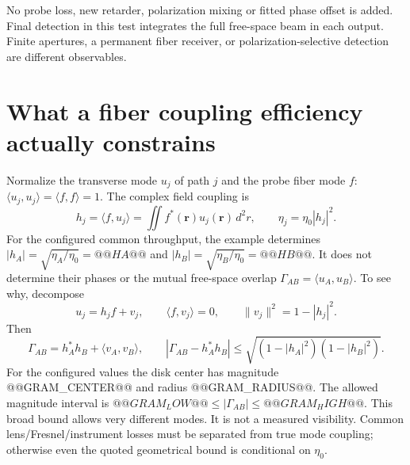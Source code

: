 \documentclass[11pt,a4paper]{article}
\begin{document}
No probe loss, new retarder, polarization mixing or fitted phase offset is added.
Final detection in this test integrates the full free-space beam in each output.
Finite apertures, a permanent fiber receiver, or polarization-selective detection
are different observables.

\section{What a fiber coupling efficiency actually constrains}
Normalize the transverse mode $u_j$ of path $j$ and the probe fiber mode $f$:
$\langle u_j,u_j\rangle=\langle f,f\rangle=1$. The complex field coupling is
\begin{equation}
h_j=\langle f,u_j\rangle=\iint f^*(\mathbf r)u_j(\mathbf r)\,d^2r,
\qquad \eta_j=\eta_0|h_j|^2.
\end{equation}
For the configured common throughput, the example determines
$|h_A|=\sqrt{\eta_A/\eta_0}=@@HA@@$ and $|h_B|=\sqrt{\eta_B/\eta_0}=@@HB@@$.
It does not determine their phases or the mutual free-space overlap
$\Gamma_{AB}=\langle u_A,u_B\rangle$. To see why, decompose
\[
u_j=h_j f+v_j,\qquad\langle f,v_j\rangle=0,\qquad
\|v_j\|^2=1-|h_j|^2.
\]
Then
\begin{equation}
\Gamma_{AB}=h_A^*h_B+\langle v_A,v_B\rangle,\qquad
|\Gamma_{AB}-h_A^*h_B|\le\sqrt{(1-|h_A|^2)(1-|h_B|^2)}.
\end{equation}
For the configured values the disk center has magnitude @@GRAM_CENTER@@ and
radius @@GRAM_RADIUS@@. The allowed magnitude interval is
$@@GRAM_LOW@@\le|\Gamma_{AB}|\le@@GRAM_HIGH@@$.
This broad bound allows very different modes. It is not a measured visibility.
Common lens/Fresnel/instrument losses must be separated from true mode coupling;
otherwise even the quoted geometrical bound is conditional on $\eta_0$.
\end{document}
